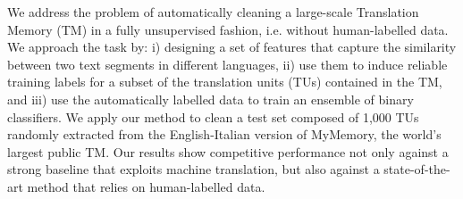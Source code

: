 We address the problem of automatically cleaning a large-scale Translation Memory (TM) in a fully unsupervised fashion, i.e. without human-labelled data. We approach the task by: i) designing a set of features that capture the similarity between two text segments in different languages, ii) use them to induce reliable training labels for a subset of the translation units (TUs) contained in the TM, and iii) use the automatically labelled data to train an ensemble of binary classifiers. We apply our method to clean a test set composed of 1,000 TUs randomly extracted from the English-Italian version of MyMemory, the world's largest public TM. Our results show competitive performance not only against a strong baseline that exploits machine translation, but also against a state-of-the-art method that relies on human-labelled data.
